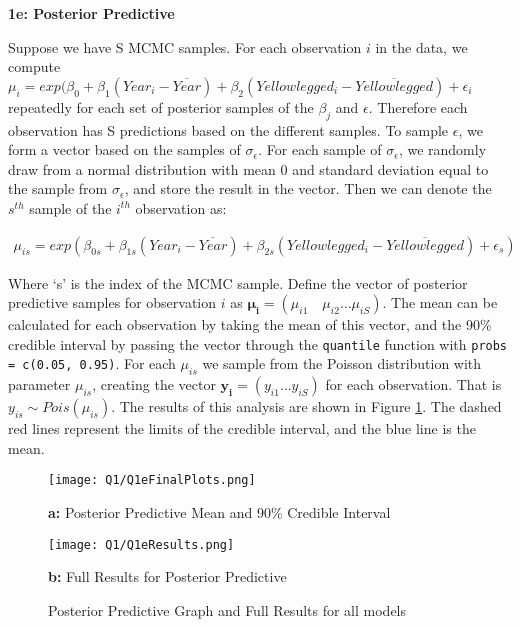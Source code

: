 \documentclass[11pt]{article}
\begin{document}
\newpage

\textbf{1e: Posterior Predictive} \label{sec::1e}

Suppose we have S MCMC samples. For each observation $i$ in the data, we compute $\mu_i = exp(\beta_0 + \beta_1(Year_i - \overline{Year}) + \beta_2(Yellowlegged_i - \overline{Yellowlegged}) + \epsilon_i$ repeatedly for each set of posterior samples of the $\beta_j$ and $\epsilon$. Therefore each observation has S predictions based on the different samples. To sample $\epsilon$, we form a vector based on the samples of $\sigma_\epsilon$. For each sample of $\sigma_\epsilon$, we randomly draw from a normal distribution with mean 0 and standard deviation equal to the sample from $\sigma_\epsilon$, and store the result in the vector. Then we can denote the $s^{th}$ sample of the $i^{th}$ observation as:

\vspace*{-3mm}

\begin{align*}
\mu_{is} = exp(\beta_{0s} + \beta_{1s}(Year_i - \overline{Year}) + \beta_{2s}(Yellowlegged_i - \overline{Yellowlegged}) + \epsilon_s)
\end{align*}

\vspace{5mm}

Where `s' is the index of the MCMC sample. Define the vector of posterior predictive samples for observation $i$ as $\boldsymbol{\mu_i} = (\mu_{i1} \quad \mu_{i2} \dots \mu_{iS})$. The mean can be calculated for each observation by taking the mean of this vector, and the 90\% credible interval by passing the vector through the \texttt{quantile} function with \texttt{probs = c(0.05, 0.95)}. For each $\mu_{is}$ we sample from the Poisson distribution with parameter $\mu_{is}$, creating the vector $\boldsymbol{y_i} = (y_{i1} \dots y_{iS})$ for each observation. That is $y_{is} \sim Pois(\mu_{is})$. The results of this analysis are shown in Figure \ref{Fig::1ePlotsResults}. The dashed red lines represent the limits of the credible interval, and the blue line is the mean. 

\begin{figure}[!h]
    \begin{minipage}[l]{0.5\textwidth}
        \texttt{[image: Q1/Q1eFinalPlots.png]}
        \centerline{\textbf{a:} Posterior Predictive Mean and 90\% Credible Interval}
    \end{minipage}
    \begin{minipage}[pos=r]{0.5\textwidth}
        \texttt{[image: Q1/Q1eResults.png]}
        \centerline{\textbf{b:} Full Results for Posterior Predictive}
    \end{minipage}
\caption{Posterior Predictive Graph and Full Results for all models} \label{Fig::1ePlotsResults}
\end{figure}
\end{document}
